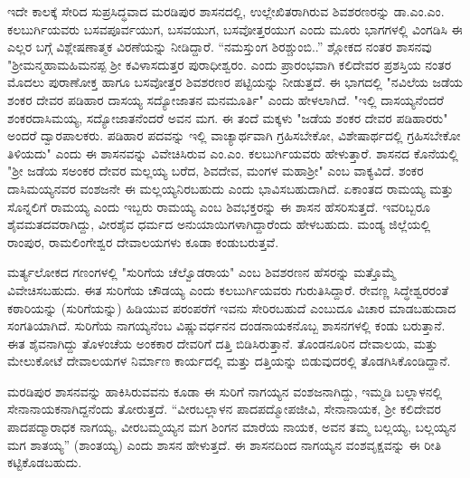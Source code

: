 ಇದೇ ಕಾಲಕ್ಕೆ ಸೇರಿದ ಸುಪ್ರಸಿದ್ಧವಾದ ಮರಡಿಪುರ ಶಾಸನದಲ್ಲಿ, ಉಲ್ಲೇಖಿತರಾಗಿರುವ ಶಿವಶರಣರನ್ನು ಡಾ.ಎಂ.ಎಂ. ಕಲಬುರ್ಗಿಯವರು ಬಸವಪೂರ್ವಯುಗ, ಬಸವಯುಗ, ಬಸವೋತ್ತರಯುಗ ಎಂದು ಮೂರು ಭಾಗಗಳಲ್ಲಿ ವಿಂಗಡಿಸಿ ಈ ಎಲ್ಲರ ಬಗ್ಗೆ ವಿಶ್ಲೇಷಣಾತ್ಮಕ ವಿರಣೆಯನ್ನು ನೀಡಿದ್ದಾರೆ. “ನಮಸ್ತುಂಗ ಶಿರಶ್ಚುಂಬಿ..” ಶ್ಲೋಕದ ನಂತರ ಶಾಸನವು "ಶ‍್ರೀಮನ್ಮಹಾಮಹಿಮನಪ್ಪ ಶ‍್ರೀ ಕವಿಳಾಸದುತ್ತರ ಪುರಾಧೀಶ್ವರಂ. ಎಂದು ಪ್ರಾರಂಭವಾಗಿ ಕಲಿದೇವರ ಪ್ರಶಸ್ತಿಯ ನಂತರ ಮೊದಲು ಪುರಾಣೋಕ್ತ ಹಾಗೂ ಬಸವೋತ್ತರ ಶಿವಶರಣರ ಪಟ್ಟಿಯನ್ನು ನೀಡುತ್ತದೆ. ಈ ಭಾಗದಲ್ಲಿ "ನವಿಲೆಯ ಜಡೆಯ ಶಂಕರ ದೇವರ ಪಡಿಹಾರ ದಾಸಯ್ಯ ಸದ್ಯೋಜಾತನ ಮನಮೂರ್ತಿ" ಎಂದು ಹೇಳಲಾಗಿದೆ. "ಇಲ್ಲಿ ದಾಸಯ್ಯನೆಂದರೆ ಶಂಕರದಾಸಿಮಯ್ಯ, ಸದ್ಯೋಜಾತನೆಂದರೆ ಅವನ ಮಗ. ಈ ತಂದೆ ಮಕ್ಕಳು "ಜಡೆಯ ಶಂಕರ ದೇವರ ಪಡಿಹಾರರು" ಅಂದರೆ ದ್ವಾರಪಾಲಕರು. ಪಡಿಹಾರ ಪದವನ್ನು ಇಲ್ಲಿ ವಾಚ್ಯಾರ್ಥವಾಗಿ ಗ್ರಹಿಸಬೇಕೋ, ವಿಶೇಷಾರ್ಥದಲ್ಲಿ ಗ್ರಹಿಸಬೇಕೋ ತಿಳಿಯದು" ಎಂದು ಈ ಶಾಸನವನ್ನು ವಿವೇಚಿಸಿರುವ ಎಂ.ಎಂ. ಕಲಬುರ್ಗಿಯವರು ಹೇಳುತ್ತಾರೆ. ಶಾಸನದ ಕೊನೆಯಲ್ಲಿ "ಶ‍್ರೀ ಜಡೆಯ ಸಅಂಕರ ದೇವರ ಮಲ್ಲಯ್ಯ ಬರೆದ, ಶಿವದೇವ, ಮಂಗಳ ಮಹಾಶ‍್ರೀ" ಎಂಬ ವಾಕ್ಯವಿದೆ. ಶಂಕರ ದಾಸಿಮಯ್ಯನವರ ವಂಶಜನೇ ಈ ಮಲ್ಲಯ್ಯನಿರಬಹುದು ಎಂದು ಭಾವಿಸಬಹುದಾಗಿದೆ. ಏಕಾಂತದ ರಾಮಯ್ಯ ಮತ್ತು ಸೊನ್ನಲಿಗೆ ರಾಮಯ್ಯ ಎಂದು ಇಬ್ಬರು ರಾಮಯ್ಯ ಎಂಬ ಶಿವಭಕ್ತರನ್ನು ಈ ಶಾಸನ ಹೆಸರಿಸುತ್ತದೆ. ಇವರಿಬ್ಬರೂ ಶೈವಮತದವರಾಗಿದ್ದು, ವೀರಶೈವ ಧರ್ಮದ ಅನುಯಾಯಿಗಳಾಗಿದ್ದಾರೆಂದು ಹೇಳಬಹುದು. ಮಂಡ್ಯ ಜಿಲ್ಲೆಯಲ್ಲಿ ರಾಂಪುರ, ರಾಮಲಿಂಗೇಶ್ವರ ದೇವಾಲಯಗಳು ಕೂಡಾ ಕಂಡುಬರುತ್ತವೆ.

ಮರ್ತ್ಯಲೋಕದ ಗಣಂಗಳಲ್ಲಿ "ಸುರಿಗೆಯ ಚೆಲ್ವೊಡರಾಯ" ಎಂಬ ಶಿವಶರಣನ ಹೆಸರನ್ನು ಮತ್ತೊಮ್ಮೆ ವಿವೇಚಿಸಬಹುದು. ಈತ ಸುರಿಗೆಯ ಚೌಡಯ್ಯ ಎಂದು ಕಲಬುರ್ಗಿಯವರು ಗುರುತಿಸಿದ್ದಾರೆ. ರೇವಣ್ಣ ಸಿದ್ಧೇಶ್ವರರಂತೆ ಕಠಾರಿಯನ್ನು (ಸುರಿಗೆಯನ್ನು) ಹಿಡಿಯುವ ಪರಂಪರೆಗೆ ಇವನು ಸೇರಿರಬಹುದೆ ಎಂಬುದೂ ವಿಚಾರ ಮಾಡಬಹುದಾದ ಸಂಗತಿಯಾಗಿದೆ. ಸುರಿಗೆಯ ನಾಗಯ್ಯನೆಂಬ ವಿಷ್ಣುವರ್ಧನನ ದಂಡನಾಯಕನೊಬ್ಬ ಶಾಸನಗಳಲ್ಲಿ ಕಂಡು ಬರುತ್ತಾನೆ. ಈತ ಶೈವನಾಗಿದ್ದು ತೊಳಂಚೆಯ ಅಂಕಕಾರ ದೇವರಿಗೆ ದತ್ತಿ ಬಿಡಿಸಿರುತ್ತಾನೆ. ತೊಂಡನೂರಿನ ದೇವಾಲಯ, ಮತ್ತು ಮೇಲುಕೋಟೆ ದೇವಾಲಯಗಳ ನಿರ್ಮಾಣ ಕಾರ್ಯದಲ್ಲಿ ಮತ್ತು ದತ್ತಿಯನ್ನು ಬಿಡುವುದರಲ್ಲಿ ತೊಡಗಿಸಿಕೊಂಡಿದ್ದಾನೆ. 

ಮರಡಿಪುರ ಶಾಸನವನ್ನು ಹಾಕಿಸಿರುವವನು ಕೂಡಾ ಈ ಸುರಿಗೆ ನಾಗಯ್ಯನ ವಂಶಜನಾಗಿದ್ದು, ಇಮ್ಮಡಿ ಬಲ್ಲಾಳನಲ್ಲಿ ಸೇನಾನಾಯಕನಾಗಿದ್ದನೆಂದು ತೋರುತ್ತದೆ. “ವೀರಬಲ್ಲಾಳನ ಪಾದಪದ್ಮೋಪಜೀವಿ, ಸೇನಾನಾಯಕ, ಶ‍್ರೀ ಕಲಿದೇವರ ಪಾದಪದ್ಮಾರಾಧಕ ನಾಗಯ್ಯ, ವೀರಬಮ್ಮಯ್ಯನ ಮಗ ಶಿಂಗನ ಮಾರೆಯ ನಾಯಕ, ಅವನ ತಮ್ಮ ಬಲ್ಲಯ್ಯ, ಬಲ್ಲಯ್ಯನ ಮಗ ಶಾತಯ್ಯ” (ಶಾಂತಯ್ಯ) ಎಂದು ಶಾಸನ ಹೇಳುತ್ತದೆ. ಈ ಶಾಸನದಿಂದ ನಾಗಯ್ಯನ ವಂಶವೃಕ್ಷವನ್ನು ಈ ರೀತಿ ಕಟ್ಟಿಕೊಡಬಹುದು.

